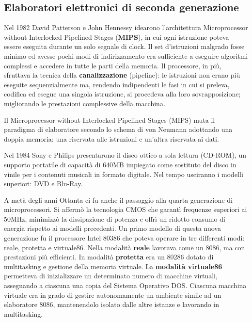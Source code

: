 \documentclass[12pt]{article}
\begin{document}
\subsection{Elaboratori elettronici di seconda generazione}
Nel 1982 David Patterson e John Hennessy idearono l’architettura Microprocessor without Interlocked Pipelined Stages (\textbf{MIPS}), in cui ogni istruzione poteva essere eseguita durante un solo segnale di clock. Il set d’istruzioni malgrado fosse minimo ed avesse pochi modi di indirizzamento era sufficiente a eseguire algoritmi complessi e accedere in tutte le parti della memoria. Il processore, in più, sfruttava la tecnica della \textbf{canalizzazione} (pipeline): le istruzioni non erano più eseguite sequenzialmente ma, rendendo indipendenti le fasi in cui si preleva, codifica ed esegue una singola istruzione, si procedeva alla loro sovrapposizione; migliorando le prestazioni complessive della macchina.\par\medskip\noindent 
Il Microprocessor without Interlocked Pipelined Stages (MIPS) muta il paradigma di elaboratore secondo lo schema di von Neumann adottando una doppia memoria: una riservata alle istruzioni e un’altra riservata ai dati.\par\medskip\noindent
Nel 1984 Sony e Philips presentarono il disco ottico a sola lettura (CD-ROM), un supporto portatile di capacità di 640MB impiegato come sostituto del disco in vinile per i contenuti musicali in formato digitale. Nel tempo usciranno i modelli superiori: DVD e Blu-Ray.\par\medskip\noindent
A metà degli anni Ottanta ci fu anche il passaggio alla quarta generazione di microprocessori. Si affermò la tecnologia CMOS che garantì frequenze superiori ai 50MHz, minimizzò la dissipazione di potenza e offrì un ridotto consumo di energia rispetto ai modelli precedenti. Un primo modello di questa nuova generazione fu il processore Intel 80386 che poteva operare in tre differenti modi: reale, protetta e virtuale86. Nella modalità \textbf{reale} lavorava come un 8086, ma con prestazioni più efficienti. In modalità \textbf{protetta} era un 80286 dotato di multitasking e gestione della memoria virtuale. La\textbf{ modalità virtuale86 }permetteva di inizializzare un determinato numero di macchine virtuali, assegnando a ciascuna una copia del Sistema Operativo DOS. Ciascuna macchina virtuale era in grado di gestire autonomamente un ambiente simile ad un elaboratore 8086, mantenendolo isolato dalle altre istanze e lavorando in multitasking.\par\medskip\noindent
\end{document}
